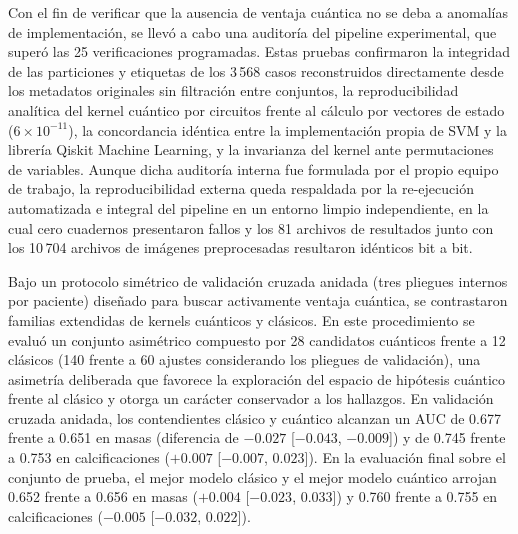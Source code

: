 Con el fin de verificar que la ausencia de ventaja cuántica no se deba a anomalías de implementación, se llevó a cabo una auditoría del pipeline experimental, que superó las 25 verificaciones programadas. Estas pruebas confirmaron la integridad de las particiones y etiquetas de los 3\,568 casos reconstruidos directamente desde los metadatos originales sin filtración entre conjuntos, la reproducibilidad analítica del kernel cuántico por circuitos frente al cálculo por vectores de estado ($6 \times 10^{-11}$), la concordancia idéntica entre la implementación propia de SVM y la librería Qiskit Machine Learning, y la invarianza del kernel ante permutaciones de variables. Aunque dicha auditoría interna fue formulada por el propio equipo de trabajo, la reproducibilidad externa queda respaldada por la re-ejecución automatizada e integral del pipeline en un entorno limpio independiente, en la cual cero cuadernos presentaron fallos y los 81 archivos de resultados junto con los 10\,704 archivos de imágenes preprocesadas resultaron idénticos bit a bit.

Bajo un protocolo simétrico de validación cruzada anidada (tres pliegues internos por paciente) diseñado para buscar activamente ventaja cuántica, se contrastaron familias extendidas de kernels cuánticos y clásicos. En este procedimiento se evaluó un conjunto asimétrico compuesto por 28 candidatos cuánticos frente a 12 clásicos (140 frente a 60 ajustes considerando los pliegues de validación), una asimetría deliberada que favorece la exploración del espacio de hipótesis cuántico frente al clásico y otorga un carácter conservador a los hallazgos. En validación cruzada anidada, los contendientes clásico y cuántico alcanzan un AUC de 0.677 frente a 0.651 en masas (diferencia de $-0.027$ [$-0.043$, $-0.009$]) y de 0.745 frente a 0.753 en calcificaciones ($+0.007$ [$-0.007$, $0.023$]). En la evaluación final sobre el conjunto de prueba, el mejor modelo clásico y el mejor modelo cuántico arrojan 0.652 frente a 0.656 en masas ($+0.004$ [$-0.023$, $0.033$]) y 0.760 frente a 0.755 en calcificaciones ($-0.005$ [$-0.032$, $0.022$]).

